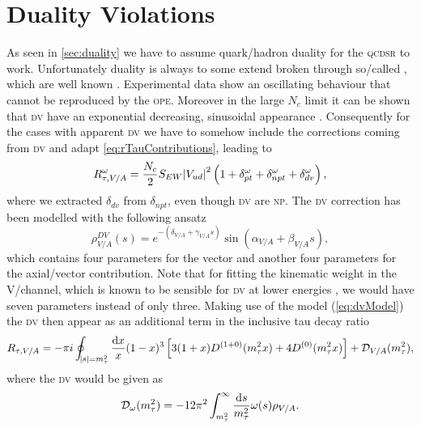 \documentclass[../../index.tex]{subfiles}
\begin{document}
\section{Duality Violations}
As seen in \cref{sec:duality} we have to assume quark\-/hadron duality for the
\textsc{qcdsr} to work. Unfortunately duality is always to some extend broken
through so\-/called , which are well known
\cite{Cata2008,Cata2009}. Experimental data show an oscillating behaviour that
cannot be reproduced by the \textsc{ope}. Moreover in the large \(N_c\) limit it
can be shown that \textsc{dv} have an exponential decreasing, sinusoidal
appearance \cite{Cata2005}. Consequently for the cases with apparent \textsc{dv}
we have to somehow include the corrections coming from \textsc{dv} and adapt
\cref{eq:rTauContributions}, leading to
\begin{equation}
  R_{\tau,V/A}^\omega = \frac{N_c}{2}S_{EW} \abs{V_{ud}}^2 \left( 1 + \delta_{pt}^{\omega} + \delta_{npt}^{\omega} + \delta_{dv}^{\omega} \right),
\end{equation}
where we extracted \(\delta_{dv}\) from \(\delta_{npt}\), even though
\textsc{dv} are \textsc{np}. The \textsc{dv} correction has been modelled with
the following ansatz \cite{Cata2009}
\begin{equation}
  \label{eq:dvModel}
  \rho_{V/A}^{DV}(s) = e^{-(\delta_{V/A}+\gamma_{V/A}s)} \sin(\alpha_{V/A} + \beta_{V/A}s),
\end{equation}
which contains four parameters for the vector and another four parameters for
the axial\-/vector contribution. Note that for fitting the kinematic weight in
the \textsc{V}\-/channel, which is known to be sensible for \textsc{dv} at lower
energies \cite{Boito2011a}, we would have seven parameters instead of only
three. Making use of the model (\cref{eq:dvModel}) the \textsc{dv} then appear
as an additional term in the inclusive tau decay ratio
\begin{equation}
  R_{\tau,V/A} = - \pi i \oint_{\abs{s}=m_\tau^2} \frac{\dif x}{x} (1 - x)^3 \left[ 3
    (1 + x) D^{(1+0)}(m_\tau^2 x) + 4 D^{(0)}(m_\tau^2 x) \right] +  \mathcal{D}_{V/A}(m_\tau^2),
\end{equation}
where the \textsc{dv} would be given as
\begin{equation}
  \mathcal{D}_\omega(m_\tau^2) = -12 \pi^2 \int_{m_\tau^2}^\infty \frac{\dif s}{m_\tau^2} \omega(s) \rho_{V/A}.
\end{equation}
\end{document}
